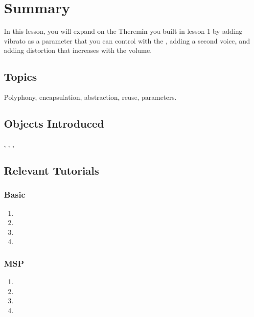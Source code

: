 

\graphicspath{{\imagedir}}

\date{\today}


\maketitle

\section*{Summary}
In this lesson, you will expand on the Theremin you built in lesson 1 by adding
vibrato as a parameter that you can control with the \gt, adding a second
voice, and adding distortion that increases with the volume.

\subsection*{Topics}
Polyphony, encapsulation, abstraction, reuse, parameters.

\subsection*{Objects Introduced}
, , , 

\subsection*{Relevant Tutorials}
\subsubsection*{Basic}
\begin{enumerate}
\item {}
\item {}
\item {}
\item {}
\end{enumerate}
\subsubsection*{MSP}
\begin{enumerate}
\item {}
\item {}
\item {}
\item {}
\end{enumerate}


